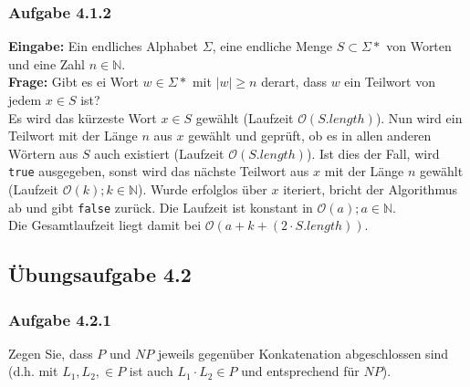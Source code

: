 \documentclass{article}
\begin{document}
\subsubsection{Aufgabe 4.1.2}
\textbf{Eingabe:} Ein endliches Alphabet $\Sigma$, eine endliche Menge $S \subset \Sigma*$ von Worten und eine Zahl $n\in\mathbb{N}$.\\
\textbf{Frage:} Gibt es ei Wort $w \in \Sigma*$ mit $|w|\geq n$ derart, dass $w$ ein Teilwort von jedem $x \in S$ ist?
\vspace{1cm}\-\\
Es wird das kürzeste Wort $x \in S$ gewählt (Laufzeit $\mathcal{O}(S.length)$).
Nun wird ein Teilwort mit der Länge $n$ aus $x$ gewählt und geprüft, ob es in allen anderen Wörtern aus $S$ auch existiert (Laufzeit $\mathcal{O}(S.length)$).
Ist dies der Fall, wird \texttt{true} ausgegeben, sonst wird das nächste Teilwort aus $x$ mit der Länge $n$ gewählt (Laufzeit $\mathcal{O}(k); k \in \mathbb{N}$).
Wurde erfolglos über $x$ iteriert, bricht der Algorithmus ab und gibt \texttt{false} zurück.
Die Laufzeit ist konstant in $\mathcal{O}(a); a \in \mathbb{N}$.\\
Die Gesamtlaufzeit liegt damit bei $\mathcal{O}(a+k+(2 \cdot S.length))$.

\subsection{Übungsaufgabe 4.2}
\begin{flushright}
\begin{Large}
[~~~~\string| ~~7~]
\end{Large}
\end{flushright}
\subsubsection{Aufgabe 4.2.1}
Zegen Sie, dass $P$ und $NP$ jeweils gegenüber Konkatenation abgeschlossen sind (d.h. mit $L_1, L_2, \in P$ ist auch $L_1 \cdot L_2 \in P$ und entsprechend für $NP$).
\vspace{1cm}\-\\
\end{document}
